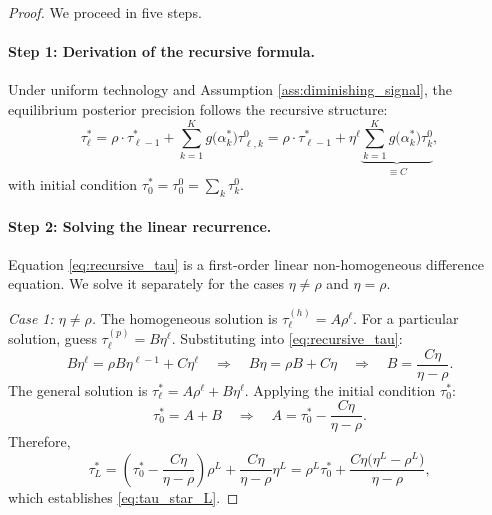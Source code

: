 \begin{proof}
We proceed in five steps.

\paragraph{Step 1: Derivation of the recursive formula.}
Under uniform technology and Assumption \ref{ass:diminishing_signal}, the equilibrium posterior precision follows the recursive structure:
\begin{equation}\label{eq:recursive_tau}
\tau^{*}_{\ell} = \rho \cdot \tau^{*}_{\ell-1} + \sum_{k=1}^{K} g\bigl(\alpha^{*}_{k}\bigr) \tau^{0}_{\ell,k}
= \rho \cdot \tau^{*}_{\ell-1} + \eta^{\ell} \underbrace{\sum_{k=1}^{K} g\bigl(\alpha^{*}_{k}\bigr) \tau^{0}_{k}}_{\equiv C},
\end{equation}
with initial condition $\tau^{*}_{0} = \tau^{0}_{0} = \sum_{k} \tau^{0}_{k}$.

\paragraph{Step 2: Solving the linear recurrence.}
Equation \eqref{eq:recursive_tau} is a first-order linear non-homogeneous difference equation. We solve it separately for the cases $\eta \neq \rho$ and $\eta = \rho$.

\textit{Case 1: $\eta \neq \rho$.} The homogeneous solution is $\tau^{(h)}_{\ell} = A \rho^{\ell}$. For a particular solution, guess $\tau^{(p)}_{\ell} = B \eta^{\ell}$. Substituting into \eqref{eq:recursive_tau}:
\begin{equation*}
B\eta^{\ell} = \rho B \eta^{\ell-1} + C\eta^{\ell}
\quad\Longrightarrow\quad
B\eta = \rho B + C\eta
\quad\Longrightarrow\quad
B = \frac{C\eta}{\eta - \rho}.
\end{equation*}
The general solution is $\tau^{*}_{\ell} = A \rho^{\ell} + B\eta^{\ell}$. Applying the initial condition $\tau^{*}_{0}$:
\begin{equation*}
\tau^{*}_{0} = A + B \quad\Longrightarrow\quad A = \tau^{*}_{0} - \frac{C\eta}{\eta - \rho}.
\end{equation*}
Therefore,
\begin{equation}
\tau^{*}_{L} = \left(\tau^{*}_{0} - \frac{C\eta}{\eta - \rho}\right)\rho^{L} + \frac{C\eta}{\eta - \rho}\eta^{L}
= \rho^{L}\tau^{*}_{0} + \frac{C\eta\bigl(\eta^{L} - \rho^{L}\bigr)}{\eta - \rho},
\end{equation}
which establishes \eqref{eq:tau_star_L}.


\end{proof}
